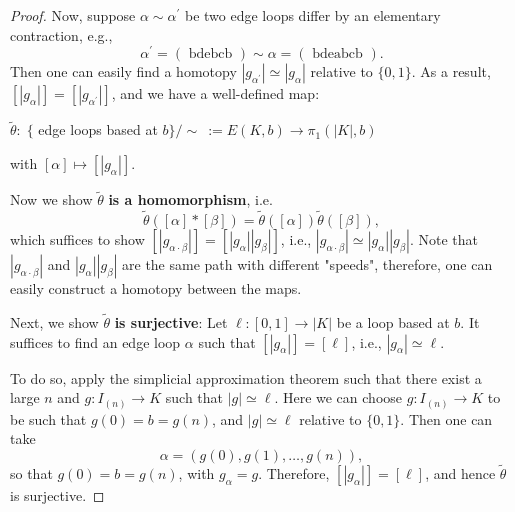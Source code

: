 \begin{proof}
Now, suppose \(\alpha  \sim  {\alpha }^{\prime }\) be two edge loops differ by an elementary contraction, e.g.,
\[
{\alpha }^{\prime } = \left( \text{ bdebcb }\right)  \sim  \alpha  = \left( \text{ bdeabcb }\right).
\]
Then one can easily find a homotopy \(\left| {g}_{{\alpha }^{\prime }}\right|  \simeq  \left| {g}_{\alpha }\right|\) relative to \(\{ 0,1\}\). As a result, \(\left\lbrack  \left| {g}_{\alpha }\right| \right\rbrack   = \left\lbrack  \left| {g}_{{\alpha }^{\prime }}\right| \right\rbrack\), and we have a well-defined map:
\begin{center}
\(\widetilde{\theta }: \;\{\) edge loops based at \(b\}  / \sim\   := E\left( {K,b}\right)\rightarrow  {\pi }_{1}\left( {\left| K\right|,b}\right)\)
\end{center}
with \(\left\lbrack  \alpha \right\rbrack   \mapsto  \left\lbrack  \left| {g}_{\alpha }\right| \right\rbrack\).

Now we show \(\widetilde{\theta }\) {\bf is a homomorphism}, i.e.
\[
\widetilde{\theta }\left( {\left\lbrack  \alpha \right\rbrack   * \left\lbrack  \beta \right\rbrack  }\right)  = \widetilde{\theta }\left( \left\lbrack  \alpha \right\rbrack  \right) \widetilde{\theta }\left( \left\lbrack  \beta \right\rbrack  \right),
\]
which suffices to show \(\left\lbrack  \left| {g}_{\alpha  \cdot  \beta }\right| \right\rbrack   = \left\lbrack  {\left| {g}_{\alpha }\right| \left| {g}_{\beta }\right| }\right\rbrack\), i.e., \(\left| {g}_{\alpha  \cdot  \beta }\right|  \simeq  \left| {g}_{\alpha }\right| \left| {g}_{\beta }\right|\). Note that \(\left| {g}_{\alpha  \cdot  \beta }\right|\) and \(\left| {g}_{\alpha }\right| \left| {g}_{\beta }\right|\) are the same path with different "speeds", therefore, one can easily construct a homotopy between the maps.

Next, we show \(\widetilde{\theta }\) {\bf is surjective}: Let \(\ell : \left\lbrack  {0,1}\right\rbrack   \rightarrow  \left| K\right|\) be a loop based at \(b\). It suffices to find an edge loop \(\alpha\) such that \(\left\lbrack  \left| {g}_{\alpha }\right| \right\rbrack   = \left\lbrack  \ell \right\rbrack\), i.e., \(\left| {g}_{\alpha }\right|  \simeq  \ell\).

To do so, apply the simplicial approximation theorem such that there exist a large \(n\) and \(g: {I}_{\left( n\right) } \rightarrow  K\) such that \(\left| g\right|  \simeq  \ell\). Here we can choose \(g: {I}_{\left( n\right) } \rightarrow  K\) to be such that \(g\left( 0 \right)  = b =  g\left( n \right)\), and \(\left| g\right|  \simeq  \ell\) relative to \(\{ 0,1\}\). Then one can take 
\[\alpha  = \left( {g\left( 0\right),g\left( 1\right),\ldots,g\left( n\right) }\right),\] 
so that \(g\left( 0\right)  = b = g\left( n\right)\), with \({g}_{\alpha } = g\). Therefore, \(\left\lbrack  \left| {g}_{\alpha }\right| \right\rbrack   = \left\lbrack  \ell \right\rbrack\), and hence \(\widetilde{\theta }\) is surjective.


\end{proof}
